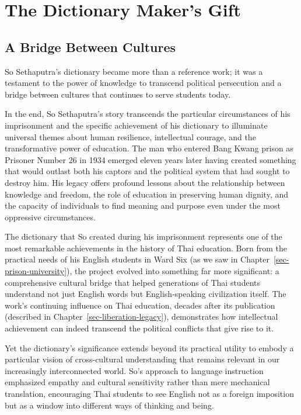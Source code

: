 \documentclass[
  Letterpaper,
]{scrbook}
\begin{document}

\chapter{The Dictionary Maker's Gift}\label{sec-dictionary-makers-gift}

\section{A Bridge Between Cultures}\label{a-bridge-between-cultures}

So Sethaputra's dictionary became more than a reference work; it was a
testament to the power of knowledge to transcend political persecution
and a bridge between cultures that continues to serve students today.

In the end, So Sethaputra's story transcends the particular
circumstances of his imprisonment and the specific achievement of his
dictionary to illuminate universal themes about human resilience,
intellectual courage, and the transformative power of education. The man
who entered Bang Kwang prison as Prisoner Number 26 in 1934 emerged
eleven years later having created something that would outlast both his
captors and the political system that had sought to destroy him. His
legacy offers profound lessons about the relationship between knowledge
and freedom, the role of education in preserving human dignity, and the
capacity of individuals to find meaning and purpose even under the most
oppressive circumstances.

The dictionary that So created during his imprisonment represents one of
the most remarkable achievements in the history of Thai education. Born
from the practical needs of his English students in Ward Six (as we saw
in Chapter~\ref{sec-prison-university}), the project evolved into
something far more significant: a comprehensive cultural bridge that
helped generations of Thai students understand not just English words
but English-speaking civilization itself. The work's continuing
influence on Thai education, decades after its publication (described in
Chapter~\ref{sec-liberation-legacy}), demonstrates how intellectual
achievement can indeed transcend the political conflicts that give rise
to it.

Yet the dictionary's significance extends beyond its practical utility
to embody a particular vision of cross-cultural understanding that
remains relevant in our increasingly interconnected world. So's approach
to language instruction emphasized empathy and cultural sensitivity
rather than mere mechanical translation, encouraging Thai students to
see English not as a foreign imposition but as a window into different
ways of thinking and being.
\end{document}
